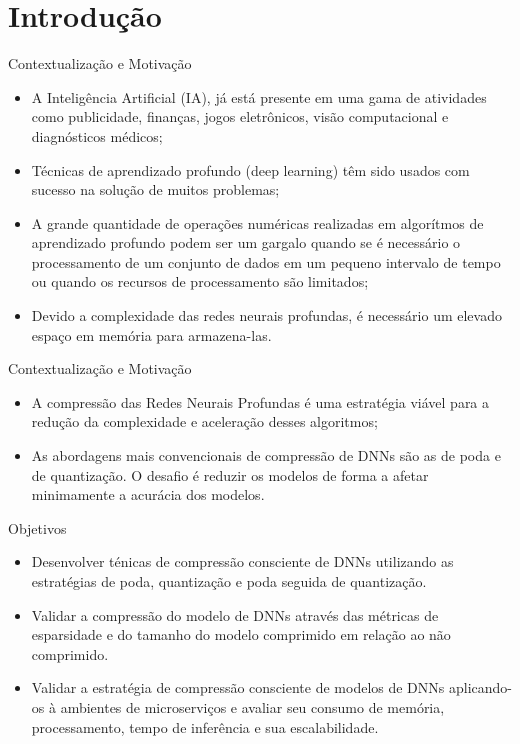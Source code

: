 \section{Introdução}
\begin{frame}{Contextualização e Motivação}
    \begin{flushleft}
	\begin{itemize}
	
	    \item A Inteligência Artificial (IA), já está presente em uma gama de atividades como publicidade, finanças, jogos eletrônicos, visão computacional e diagnósticos médicos;
        \item Técnicas de aprendizado profundo (deep learning) têm sido usados com sucesso na solução de muitos problemas;
        \item A grande quantidade de operações numéricas realizadas em algorítmos de aprendizado profundo podem ser um gargalo quando se é necessário o processamento de um conjunto de dados em um pequeno intervalo de tempo ou quando os recursos de processamento são limitados;
        \item Devido a complexidade das redes neurais profundas, é necessário um elevado espaço em memória para armazena-las.
    \end{itemize}
    \end{flushleft}
\end{frame}

\begin{frame}{Contextualização e Motivação}
    \begin{flushleft}
    	\begin{itemize}
	
	    \item A compressão das Redes Neurais Profundas é uma estratégia viável para a redução da complexidade e aceleração desses algoritmos;
        \item As abordagens mais convencionais de compressão de DNNs são as de poda e de quantização. O desafio é reduzir os modelos de forma a afetar minimamente a acurácia dos modelos.
    \end{itemize}
    \end{flushleft}
\end{frame}


\begin{frame}{Objetivos}
	\begin{itemize}
        \item Desenvolver ténicas de compressão consciente de DNNs utilizando as estratégias de poda, quantização e poda seguida de quantização.
        \item Validar a compressão do modelo de DNNs através das métricas de esparsidade e do tamanho do modelo comprimido em relação ao não comprimido.
        \item Validar a estratégia de compressão consciente de modelos de DNNs aplicando-os à ambientes de microserviços e avaliar seu consumo de memória, processamento, tempo de inferência e sua escalabilidade.
    \end{itemize}
\end{frame}
